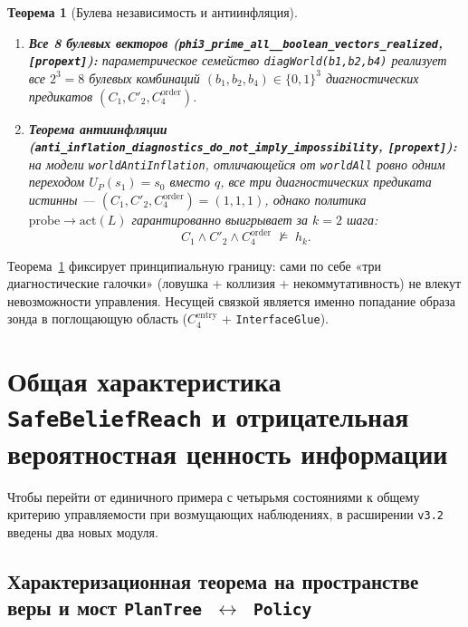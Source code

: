 \documentclass[10pt,a4paper]{article}
\theoremstyle{cleanthm}
\newtheorem{theorem}{Теорема}[section]
\theoremstyle{cleandef}
\begin{document}
\begin{theorem}[Булева независимость и антиинфляция]
\label{thm:bool_anti}
\begin{enumerate}
  \item \textbf{Все 8 булевых векторов (\texttt{phi3\_\allowbreak prime\_\allowbreak all\_\_\allowbreak boolean\_\allowbreak vectors\_\allowbreak realized}, \texttt{[propext]}):} параметрическое семейство \texttt{diagWorld(b1,b2,b4)} реализует все $2^3=8$ булевых комбинаций $(b_1,b_2,b_4)\in\{0,1\}^3$ диагностических предикатов $(C_1,C'_2,C_4^{\mathrm{order}})$.
  \item \textbf{Теорема антиинфляции (\texttt{anti\_\allowbreak inflation\_\allowbreak diagnostics\_\allowbreak do\_\allowbreak not\_\allowbreak imply\_\allowbreak impossibility}, \texttt{[propext]}):} на модели \texttt{worldAntiInflation}, отличающейся от \texttt{worldAll} ровно одним переходом $U_P(s_1)=s_0$ вместо $q$, все три диагностических предиката истинны — $(C_1,C'_2,C_4^{\mathrm{order}})=(1,1,1)$, однако политика $\mathrm{probe}\to\mathrm{act}(L)$ гарантированно выигрывает за $k=2$ шага:
  \begin{equation}
    C_1 \land C'_2 \land C_4^{\mathrm{order}} \;\not\models\; h_k.
  \end{equation}
\end{enumerate}
\end{theorem}

Теорема~\ref{thm:bool_anti} фиксирует принципиальную границу: сами по себе «три диагностические галочки» (ловушка + коллизия + некоммутативность) не влекут невозможности управления. Несущей связкой является именно попадание образа зонда в поглощающую область ($C_4^{\mathrm{entry}}$ + \texttt{InterfaceGlue}).

\section{Общая характеристика \texorpdfstring{\texttt{SafeBeliefReach}}{SafeBeliefReach} и отрицательная вероятностная ценность информации}

Чтобы перейти от единичного примера с четырьмя состояниями к общему критерию управляемости при возмущающих наблюдениях, в расширении \texttt{v3.2} введены два новых модуля.

\subsection{Характеризационная теорема на пространстве веры и мост \texorpdfstring{\texttt{PlanTree}~$\leftrightarrow$~\texttt{Policy}}{PlanTree <-> Policy}}
\end{document}
